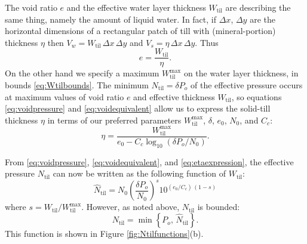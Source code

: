 \documentclass[gmd]{copernicus}   %
\newcommand{\text}{\textrm}
\newcommand{\Ntil}{N_{\text{til}}}
\newcommand{\hatNtil}{\hat N_{\text{til}}}
\newcommand{\Wtil}{W_{\text{til}}}
\newcommand{\Wtilmax}{W_{\text{til}}^{\text{max}}}
\begin{document}
The void ratio $e$ and the effective water layer thickness $\Wtil$ are describing the same thing, namely the amount of liquid water.  In fact, if $\Delta x$, $\Delta y$ are the horizontal dimensions of a rectangular patch of till with (mineral-portion) thickness $\eta$ then $V_w = \Wtil \,\Delta x \,\Delta y$ and $V_s = \eta \,\Delta x \,\Delta y$.  Thus
\begin{equation}
e = \frac{\Wtil}{\eta}.  \label{eq:voidequivalent}
\end{equation}
On the other hand we specify a maximum $\Wtilmax$ on the water layer thickness, in bounds \eqref{eq:Wtilbounds}.  The minimum $\Ntil=\delta P_o$ of the effective pressure occurs at maximum values of void ratio $e$ and effective thickness $\Wtil$, so equations \eqref{eq:voidpressure} and \eqref{eq:voidequivalent} allow us to express the solid-till thickness $\eta$ in terms of our preferred parameters $\Wtilmax$, $\delta$, $e_0$, $N_0$, and $C_c$:
\begin{equation}
\eta = \frac{\Wtilmax}{e_0 - C_c \log_{10}\left(\delta P_o / N_0\right)}.  \label{eq:etaexpression}
\end{equation}

From \eqref{eq:voidpressure}, \eqref{eq:voidequivalent}, and \eqref{eq:etaexpression}, the effective pressure $\Ntil$ can now be written as the following function of $\Wtil$:
\begin{equation}
\hatNtil = N_0 \left(\frac{\delta P_o}{N_0}\right)^s 10^{(e_0/C_c)\,(1-s)}
\label{eq:NtilofWtil}
\end{equation}
where $s = \Wtil/\Wtilmax$.  However, as noted above, $\Ntil$ is bounded:
\begin{equation}
\Ntil = \min\left\{P_o,\, \hatNtil\right\}.
\label{eq:Wtilpressure}
\end{equation}
This function is shown in Figure \ref{fig:Ntilfunctions}(b).
\end{document}
